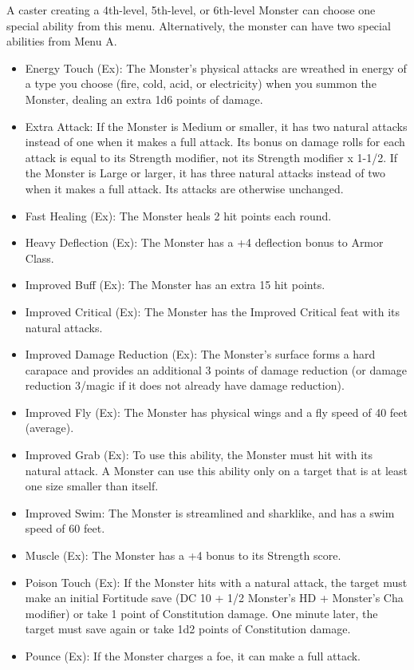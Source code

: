 A caster creating a 4th-level, 5th-level, or 6th-level Monster 
can choose one special ability from this menu. 
Alternatively, the monster can have two special abilities from Menu A.
\begin{itemize}
\item Energy Touch (Ex): The Monster's physical attacks are wreathed in energy of a type you choose 
(fire, cold, acid, or electricity) when you summon the Monster, dealing an extra 1d6 points of damage.
\item Extra Attack: If the Monster is Medium or smaller, 
it has two natural attacks instead of one when it makes a full attack. 
Its bonus on damage rolls for each attack is equal to its Strength modifier, 
not its Strength modifier x 1-1/2. If the Monster is Large or larger, 
it has three natural attacks instead of two when it makes a full attack. Its attacks are otherwise unchanged. 
\item Fast Healing (Ex): The Monster heals 2 hit points each round. 
\item Heavy Deflection (Ex): The Monster has a +4 deflection bonus to Armor Class.
\item Improved Buff (Ex): The Monster has an extra 15 hit points.
\item Improved Critical (Ex): The Monster has the Improved Critical feat with its natural attacks.
\item Improved Damage Reduction (Ex): The Monster's surface forms a 
hard carapace and provides an additional 3 points of damage reduction 
(or damage reduction 3/magic if it does not already have damage reduction).
\item Improved Fly (Ex): The Monster has physical wings and a fly speed of 40 feet (average).
\item Improved Grab (Ex): To use this ability, the Monster must hit with its natural attack. 
A Monster can use this ability only on a target that is at least one size smaller than itself. 
\item Improved Swim: The Monster is streamlined and sharklike, and has a swim speed of 60 feet.
\item Muscle (Ex): The Monster has a +4 bonus to its Strength score.
\item Poison Touch (Ex): If the Monster hits with a natural attack, 
the target must make an initial Fortitude save (DC 10 + 1/2 Monster's HD + Monster's Cha modifier) 
or take 1 point of Constitution damage. 
One minute later, the target must save again or take 1d2 points of Constitution damage.
\item Pounce (Ex): If the Monster charges a foe, it can make a full attack. 

\end{itemize}
